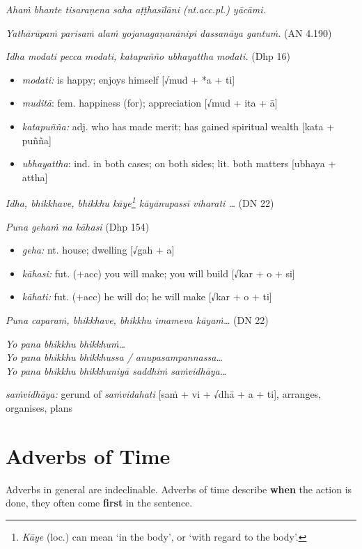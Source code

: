 \documentclass[11pt,oneside]{memoir}
\begin{document}
\emph{Ahaṁ bhante tisaraṇena saha aṭṭhasīlāni (nt.acc.pl.) yācāmi.}

\emph{Yathārūpaṁ parisaṁ alaṁ yojanagaṇanānipi dassanāya gantuṁ.} (AN 4.190)

\emph{Idha modati pecca modati, katapuñño ubhayattha modati.} (Dhp 16)

\begin{itemize}
\item \emph{modati:} is happy; enjoys himself [√mud + *a + ti]
\item \emph{muditā}: fem. happiness (for); appreciation [√mud + ita + ā]
\item \emph{katapuñña:} adj. who has made merit; has gained spiritual wealth [kata + puñña]
\item \emph{ubhayattha}: ind. in both cases; on both sides; lit. both matters [ubhaya + attha]
\end{itemize}

\emph{Idha, bhikkhave, bhikkhu kāye\footnote{\emph{Kāye} (loc.) can mean `in the body', or `with regard to the body'.} kāyānupassī viharati \ldots{}} (DN 22)

\emph{Puna gehaṁ na kāhasi} (Dhp 154)

\begin{itemize}
\item \emph{geha:} nt. house; dwelling [√gah + a]
\item \emph{kāhasi:} fut. (+acc) you will make; you will build [√kar + o + si]
\item \emph{kāhati:} fut. (+acc) he will do; he will make [√kar + o + ti]
\end{itemize}

\emph{Puna caparaṁ, bhikkhave, bhikkhu imameva kāyaṁ\ldots{}} (DN 22)

\emph{Yo pana bhikkhu bhikkhuṁ\ldots{}} \\
\emph{Yo pana bhikkhu bhikkhussa / anupasampannassa\ldots{}} \\
\emph{Yo pana bhikkhu bhikkhuniyā saddhiṁ saṁvidhāya\ldots{}}

\emph{saṁvidhāya:} gerund of \emph{saṁvidahati} {[}saṁ + vi + √dhā + a + ti], arranges, organises, plans

\clearpage
\section{Adverbs of Time}
\label{sec:org268f9b4}

Adverbs in general are indeclinable. Adverbs of time describe \textbf{when} the action
is done, they often come \textbf{first} in the sentence.
\end{document}

